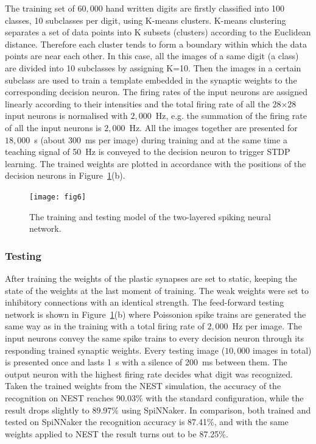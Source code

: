 \documentclass{frontiersENG} %
\begin{document}
The training set of $60,000$ hand written digits are firstly classified into 100 classes, 10 subclasses per digit, using K-means clusters.
K-means clustering separates a set of data points into K subsets (clusters) according to the Euclidean distance.
Therefore each cluster tends to form a boundary within which the data points are near each other.
In this case, all the images of a same digit (a class) are divided into 10 subclasses by assigning K=10.
Then the images in a certain subclass are used to train a template embedded in the synaptic weights to the corresponding decision neuron.
The firing rates of the input neurons are assigned linearly according to their intensities and the total firing rate of all the 28$\times$28 input neurons is normalised with $2,000$~Hz, e.g. the summation of the firing rate of all the input neurons is $2,000$~Hz.
All the images together are presented for $18,000$~s (about 300~ms per image) during training and at the same time a teaching signal of 50~Hz is conveyed to the decision neuron to trigger STDP learning.
The trained weights are plotted in accordance with the positions of the decision neurons in Figure~\ref{fig:model}(b).
\begin{figure}[thb!]
	\centering
%	
%	
	\texttt{[image: fig6]}
	\caption{The training and testing model of the two-layered spiking neural network.}
	\label{fig:model}
\end{figure} 



\subsubsection{Testing}
After training the weights of the plastic synapses are set to static, keeping the state of the weights at the last moment of training.
The weak weights were set to inhibitory connections with an identical strength.
The feed-forward testing network is shown in Figure~\ref{fig:model}(b) where Poissonion spike trains are generated the same way as in the training with a total firing rate of $2,000$~Hz per image.
The input neurons convey the same spike trains to every decision neuron through its responding trained synaptic weights. 
Every testing image ($10,000$ images in total) is presented once and lasts 1~s with a silence of 200~ms between them.
The output neuron with the highest firing rate decides what digit was recognized.
Taken the trained weights from the NEST simulation, the accuracy of the recognition on NEST reaches 90.03\% with the standard configuration, while the result drops slightly to 89.97\% using SpiNNaker.
In comparison, both trained and tested on SpiNNaker the recognition accuracy is 87.41\%, and with the same weights applied to NEST the result turns out to be 87.25\%. 
\end{document}
